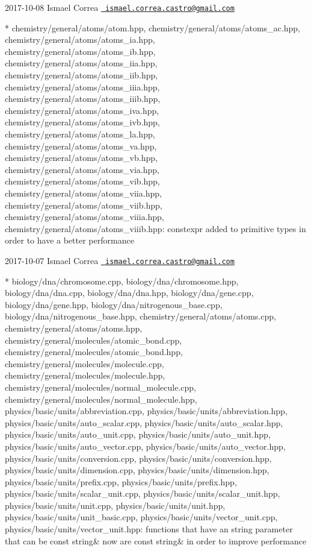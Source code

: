  2017-\/10-\/08 Ismael Correa \href{mailto:ismael.correa.castro@gmail.com}{\texttt{ ismael.\+correa.\+castro@gmail.\+com}} \begin{DoxyVerb}* chemistry/general/atoms/atom.hpp,
chemistry/general/atoms/atoms_ac.hpp,
chemistry/general/atoms/atoms_ia.hpp,
chemistry/general/atoms/atoms_ib.hpp,
chemistry/general/atoms/atoms_iia.hpp,
chemistry/general/atoms/atoms_iib.hpp,
chemistry/general/atoms/atoms_iiia.hpp,
chemistry/general/atoms/atoms_iiib.hpp,
chemistry/general/atoms/atoms_iva.hpp,
chemistry/general/atoms/atoms_ivb.hpp,
chemistry/general/atoms/atoms_la.hpp,
chemistry/general/atoms/atoms_va.hpp,
chemistry/general/atoms/atoms_vb.hpp,
chemistry/general/atoms/atoms_via.hpp,
chemistry/general/atoms/atoms_vib.hpp,
chemistry/general/atoms/atoms_viia.hpp,
chemistry/general/atoms/atoms_viib.hpp,
chemistry/general/atoms/atoms_viiia.hpp,
chemistry/general/atoms/atoms_viiib.hpp: constexpr added to
primitive types in order to have a better performance
\end{DoxyVerb}
 2017-\/10-\/07 Ismael Correa \href{mailto:ismael.correa.castro@gmail.com}{\texttt{ ismael.\+correa.\+castro@gmail.\+com}} \begin{DoxyVerb}* biology/dna/chromosome.cpp, biology/dna/chromosome.hpp,
biology/dna/dna.cpp, biology/dna/dna.hpp, biology/dna/gene.cpp,
biology/dna/gene.hpp, biology/dna/nitrogenous_base.cpp,
biology/dna/nitrogenous_base.hpp,
chemistry/general/atoms/atoms.cpp,
chemistry/general/atoms/atoms.hpp,
chemistry/general/molecules/atomic_bond.cpp,
chemistry/general/molecules/atomic_bond.hpp,
chemistry/general/molecules/molecule.cpp,
chemistry/general/molecules/molecule.hpp,
chemistry/general/molecules/normal_molecule.cpp,
chemistry/general/molecules/normal_molecule.hpp,
physics/basic/units/abbreviation.cpp,
physics/basic/units/abbreviation.hpp,
physics/basic/units/auto_scalar.cpp,
physics/basic/units/auto_scalar.hpp,
physics/basic/units/auto_unit.cpp,
physics/basic/units/auto_unit.hpp,
physics/basic/units/auto_vector.cpp,
physics/basic/units/auto_vector.hpp,
physics/basic/units/conversion.cpp,
physics/basic/units/conversion.hpp,
physics/basic/units/dimension.cpp,
physics/basic/units/dimension.hpp, physics/basic/units/prefix.cpp,
physics/basic/units/prefix.hpp,
physics/basic/units/scalar_unit.cpp,
physics/basic/units/scalar_unit.hpp, physics/basic/units/unit.cpp,
physics/basic/units/unit.hpp, physics/basic/units/unit_basic.cpp,
physics/basic/units/vector_unit.cpp,
physics/basic/units/vector_unit.hpp: functions that have an string
parameter that can be const string& now are const string& in order
to improve performance
\end{DoxyVerb}

